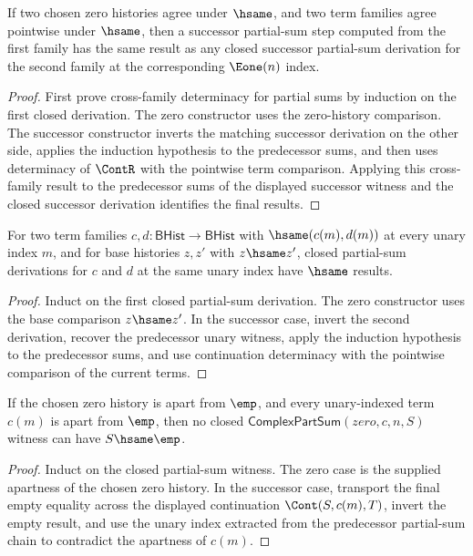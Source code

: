 \begin{lemma}
\label{lem:complex-part-sum-successor-term-hsame-deterministic}
If two chosen zero histories agree under $\hsame$, and two term families agree
pointwise under $\hsame$, then a successor partial-sum step computed from the
first family has the same result as any closed successor partial-sum derivation
for the second family at the corresponding $\Eone(n)$ index.
\end{lemma}
\begin{proof}
First prove cross-family determinacy for partial sums by induction on the first
closed derivation. The zero constructor uses the zero-history comparison. The
successor constructor inverts the matching successor derivation on the other
side, applies the induction hypothesis to the predecessor sums, and then uses
determinacy of $\ContR$ with the pointwise term comparison. Applying this
cross-family result to the predecessor sums of the displayed successor witness
and the closed successor derivation identifies the final results.
\end{proof}

\begin{lemma}
\label{lem:complex-part-sum-pointwise-hsame-deterministic}
For two term families $c,d:\mathsf{BHist}\to\mathsf{BHist}$ with
$\hsame(c(m),d(m))$ at every unary index $m$, and for base histories
$z,z'$ with $z\hsame z'$, closed partial-sum derivations for $c$ and $d$ at
the same unary index have $\hsame$ results.
\end{lemma}
\begin{proof}
Induct on the first closed partial-sum derivation. The zero constructor uses
the base comparison $z\hsame z'$. In the successor case, invert the
second derivation, recover the predecessor unary witness, apply the induction
hypothesis to the predecessor sums, and use continuation determinacy with the
pointwise comparison of the current terms.
\end{proof}

\begin{lemma}
\label{lem:complex-part-sum-result-nonempty-of-nonempty-terms}
If the chosen zero history is apart from $\emp$, and every unary-indexed term
$c(m)$ is apart from $\emp$, then no closed
$\mathsf{ComplexPartSum}(zero,c,n,S)$ witness can have $S\hsame\emp$.
\end{lemma}
\begin{proof}
Induct on the closed partial-sum witness. The zero case is the supplied
apartness of the chosen zero history. In the successor case, transport the
final empty equality across the displayed continuation
$\Cont(S,c(m),T)$, invert the empty result, and use the unary index extracted
from the predecessor partial-sum chain to contradict the apartness of $c(m)$.
\end{proof}

